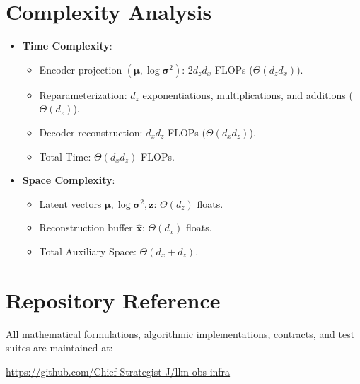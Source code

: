 \documentclass[11pt,a4paper]{article}
\theoremstyle{definition}
\begin{document}
\section{Complexity Analysis}
\begin{itemize}
    \item \textbf{Time Complexity}:
    \begin{itemize}
        \item Encoder projection $(\boldsymbol{\mu}, \log \boldsymbol{\sigma}^2)$: $2 d_z d_x$ FLOPs ($\Theta(d_z d_x)$).
        \item Reparameterization: $d_z$ exponentiations, multiplications, and additions ($\Theta(d_z)$).
        \item Decoder reconstruction: $d_x d_z$ FLOPs ($\Theta(d_x d_z)$).
        \item Total Time: $\Theta(d_x d_z)$ FLOPs.
    \end{itemize}
    \item \textbf{Space Complexity}:
    \begin{itemize}
        \item Latent vectors $\boldsymbol{\mu}, \log \boldsymbol{\sigma}^2, \mathbf{z}$: $\Theta(d_z)$ floats.
        \item Reconstruction buffer $\hat{\mathbf{x}}$: $\Theta(d_x)$ floats.
        \item Total Auxiliary Space: $\Theta(d_x + d_z)$.
    \end{itemize}
\end{itemize}

\section{Repository Reference}
All mathematical formulations, algorithmic implementations, contracts, and test suites are maintained at:
\begin{center}
\url{https://github.com/Chief-Strategist-J/llm-obs-infra}
\end{center}
\end{document}
